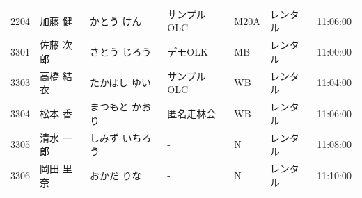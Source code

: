 \documentclass[a4paper,10pt]{ltjsarticle}
\begin{document}
\begin{longtable}{r>{\raggedright\arraybackslash}p{}>{\raggedright\arraybackslash}p{}>{\raggedright\arraybackslash}p{}lll}
2204 & 加藤 健 & かとう けん & サンプルOLC & M20A & レンタル & 11:06:00 \\
3301 & 佐藤 次郎 & さとう じろう & デモOLK & MB & レンタル & 11:00:00 \\
3303 & 高橋 結衣 & たかはし ゆい & サンプルOLC & WB & レンタル & 11:04:00 \\
3304 & 松本 香 & まつもと かおり & 匿名走林会 & WB & レンタル & 11:06:00 \\
3305 & 清水 一郎 & しみず いちろう & - & N & レンタル & 11:08:00 \\
3306 & 岡田 里奈 & おかだ りな & - & N & レンタル & 11:10:00 \\
\end{longtable}
\end{document}
